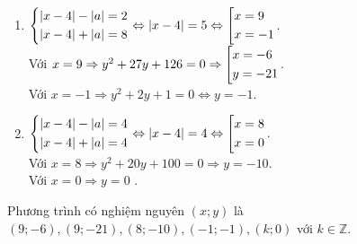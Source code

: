 \begin{ex}
{\begin{enumerate}
			\begin{enumerate}[TH1:]
				\item $\left\{\begin{aligned}&|x-4|-|a|=2 \\&|x-4|+|a|=8\end{aligned}\right.\Leftrightarrow |x-4|=5 \Leftrightarrow \left[\begin{aligned}&x=9\\&x=-1\end{aligned}\right.$. \\
				Với $x=9 \Rightarrow y^2+27y+126=0 \Rightarrow \left[\begin{aligned}&x=-6\\&y=-21\end{aligned}\right.$.\\
				Với $x=-1 \Rightarrow y^2+2y+1=0 \Leftrightarrow y=-1$.
				\item $\left\{\begin{aligned}&|x-4|-|a|=4 \\&|x-4|+|a|=4\end{aligned}\right.\Leftrightarrow |x-4|=4 \Leftrightarrow \left[\begin{aligned}&x=8\\&x=0\end{aligned}\right.$.\\
				Với $x=8 \Rightarrow y^2+20y+100=0\Rightarrow y=-10$.\\
				Với $x=0 \Rightarrow y=0$ .
			\end{enumerate}
			Phương trình có nghiệm nguyên $(x;y)$ là $(9;-6),(9;-21),(8;-10),(-1;-1),(k;0)$ với $k\in \mathbb{Z}$.
		\end{enumerate}
	}
\end{ex}
